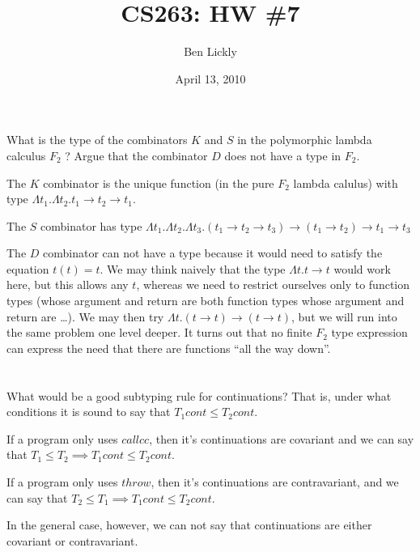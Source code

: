 \documentclass{article}
\title{CS263: HW \#7}
\author{Ben Lickly}
\date{April 13, 2010}
\newcommand{\problem}[1]
{\subsubsection*{} %
\vspace{-16pt} \section{} \vspace{-22pt} \qquad
#1%
\bigskip \bigskip
}
\begin{document}
\maketitle

\problem{What is the type of the combinators $K$ and $S$ in the polymorphic
lambda calculus $F_2$ ? Argue that the combinator $D$ does not have a type in
$F_2$.
}

The $K$ combinator is the unique function (in the pure $F_2$
lambda calulus) with type
$\Lambda t_1. \Lambda t_2. t_1 \to t_2 \to t_1$.

The $S$ combinator has type
$\Lambda t_1. \Lambda t_2. \Lambda t_3.
(t_1 \to t_2 \to t_3) \to (t_1 \to t_2) \to t_1 \to t_3$

The $D$ combinator can not have a type because it would need to satisfy the
equation $t(t) = t$.  We may think naively that the type $\Lambda t. t \to t$
would work here, but this allows any $t$, whereas we need to restrict ourselves
only to function types (whose argument and return are both function types whose
argument and return are \dots).  We may then try
$\Lambda t. (t \to t) \to (t \to t)$, but we will run into the same problem one
level deeper.  It turns out that no finite $F_2$ type expression can express
the need that there are functions ``all the way down''.

\problem{What would be a good subtyping rule for continuations?  That is, under
what conditions it is sound to say that $T_1 cont \le T_2 cont$.
}

If a program only uses $callcc$, then it's continuations are covariant and we
can say that $T_1 \le T_2 \implies T_1 cont \le T_2 cont$.

If a program only uses $throw$, then it's continuations are contravariant, and
we can say that $T_2 \le T_1 \implies T_1 cont \le T_2 cont$.

In the general case, however, we can not say that continuations are either
covariant or contravariant.
\end{document}
